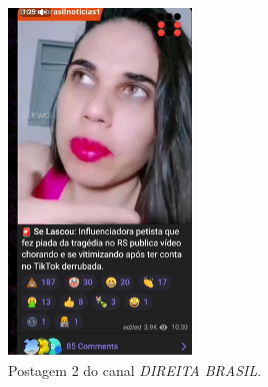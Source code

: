\documentclass[portuguese]{textolivre}
\begin{document}
\begin{figure}[h!]
\begin{minipage}[t]{0.21\textwidth}
        \includegraphics[width=\linewidth]{Imagens/Fig29.png}
        \caption{Postagem 2 do canal \emph{DIREITA BRASIL}.}
        \label{fig-29}
    \end{minipage}\hfill
    \begin{minipage}[t]{0.32\textwidth}
        \centering

\end{minipage}
\end{figure}
\end{document}
